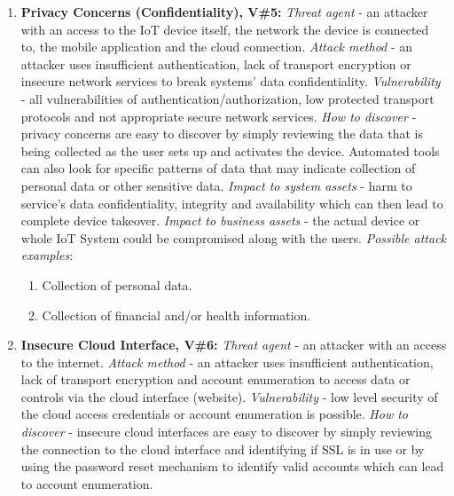 \documentclass[12pt]{article}
\begin{document}
\begin{enumerate}
\begin{enumerate}[label=(\roman*)]
			\end{enumerate}
	\item \textbf{Privacy Concerns (Confidentiality), V\#5:}
		\newline \textit{Threat agent} - an attacker with an access to the IoT device itself, the network the device is connected to, the mobile application and the cloud connection.
		\newline \textit{Attack method} - an attacker uses insufficient authentication, lack of transport encryption or insecure network services to break systems’ data confidentiality.
		\newline \textit{Vulnerability} - all vulnerabilities of authentication/authorization, low protected transport protocols and not appropriate secure network services.
		\newline \textit{How to discover} - privacy concerns are easy to discover by simply reviewing the data that is being collected as the user sets up and activates the device. Automated tools can also look for specific patterns of data that may indicate collection of personal data or other sensitive data.
		\newline \textit{Impact to system assets} - harm to service’s data confidentiality, integrity and availability which can then lead to complete device takeover.
		\newline \textit{Impact to business assets} - the actual device or whole IoT System could be compromised along with the users.
		\newline \textit{Possible attack examples}:
		\begin{enumerate}[label=(\roman*)]
			\item Collection of personal data.
			\item Collection of financial and/or health information.
		\end{enumerate}
	\item \textbf{Insecure Cloud Interface, V\#6:}
		\newline \textit{Threat agent} - an attacker with an access to the internet.
		\newline \textit{Attack method} - an attacker uses insufficient authentication, lack of transport encryption and account enumeration to access data or controls via the cloud interface (website).
		\newline \textit{Vulnerability} - low level security of the cloud access credentials or account enumeration is possible.
		\newline \textit{How to discover} - insecure cloud interfaces are easy to discover by simply reviewing the connection to the cloud interface and identifying if SSL is in use or by using the password reset mechanism to identify valid accounts which can lead to account enumeration.

\end{enumerate}
\end{document}
